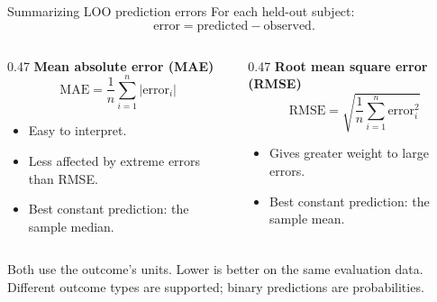 \documentclass[11pt,aspectratio=169]{beamer}
\begin{document}
\begin{frame}{Summarizing LOO prediction errors}
For each held-out subject:
\[
  \text{error} = \text{predicted} - \text{observed}.
\]

\begin{columns}[T,onlytextwidth]
\begin{column}{0.47\textwidth}
\textbf{Mean absolute error (MAE)}
\[
  \mathrm{MAE} = \frac{1}{n}\sum_{i=1}^{n}|\text{error}_i|
\]
\begin{itemize}
  \item Easy to interpret.
  \item Less affected by extreme errors than RMSE.
  \item Best constant prediction: the sample median.
\end{itemize}
\end{column}
\begin{column}{0.47\textwidth}
\textbf{Root mean square error (RMSE)}
\[
  \mathrm{RMSE} = \sqrt{\frac{1}{n}\sum_{i=1}^{n}\text{error}_i^2}
\]
\begin{itemize}
  \item Gives greater weight to large errors.
  \item Best constant prediction: the sample mean.
\end{itemize}
\end{column}
\end{columns}

\bigskip
\small
Both use the outcome's units. Lower is better on the same evaluation data.\\
Different outcome types are supported; binary predictions are probabilities.
\end{frame}
\end{document}
